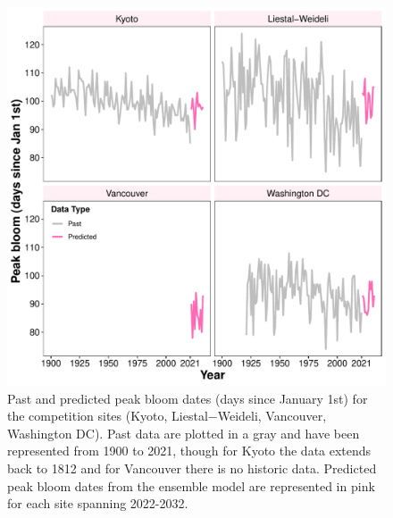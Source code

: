 \documentclass[a4paper,11pt]{article}
\begin{document}
\begin{figure}
  \includegraphics[width=\textwidth]{Figures/time_seriesPlot.pdf}
  \caption{Past and predicted peak bloom dates (days since January 1st) for the competition sites (Kyoto, Liestal−Weideli, Vancouver, Washington DC). Past data are plotted in a gray and have been represented from 1900 to 2021, though for Kyoto the data extends back to 1812 and for Vancouver there is no historic data. Predicted peak bloom dates from the ensemble model are represented in pink for each site spanning 2022-2032.}
  \label{fig:tsPredications}
\end{figure}






\clearpage


\end{document}
